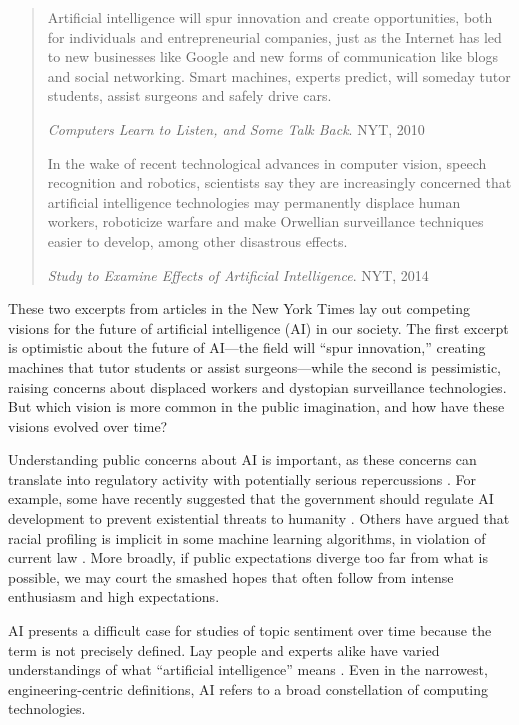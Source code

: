 \documentclass[letterpaper]{article}
\begin{document}
\begin{quote}
\footnotesize
Artificial intelligence will spur innovation and create opportunities, both for individuals and entrepreneurial companies, just as the Internet has led to new businesses like Google and new forms of communication like blogs and social networking. Smart machines, experts predict, will someday  tutor students, assist surgeons and safely drive cars.

\textit{Computers Learn to Listen, and Some Talk Back}. NYT, 2010

In the wake of recent technological advances in computer vision, speech recognition and robotics, scientists say they are increasingly concerned that artificial intelligence technologies may permanently displace human workers, roboticize warfare and make Orwellian surveillance techniques easier to develop, among other disastrous effects.

\textit{Study to Examine Effects of Artificial Intelligence}. NYT, 2014

\normalsize
\end{quote}

These two excerpts from articles in the New York Times lay out competing visions for the future of artificial intelligence (AI) in our society. The first excerpt is optimistic about the future of AI---the field will ``spur innovation,'' creating machines that tutor students or assist surgeons---while the second is pessimistic, raising concerns about displaced workers and dystopian surveillance technologies. But which vision is more common in the public imagination, and how have these visions evolved over time?

Understanding public concerns about AI is important, as these concerns can translate into regulatory activity with potentially serious repercussions \cite{ai100}. For example, some have recently suggested that the government should regulate AI development to prevent existential threats to humanity \cite{elon-regulatory}. Others have argued that racial profiling is implicit in some machine learning algorithms, in violation of current law \cite{machine-bias}. More broadly, if public expectations diverge too far from what is possible, we may court the smashed hopes that often follow from intense enthusiasm and high expectations.

AI presents a difficult case for studies of topic sentiment over time because the term is not precisely defined. Lay people and experts alike have varied understandings of what ``artificial intelligence'' means \cite{ai100}.  Even in the narrowest, engineering-centric definitions, AI refers to a broad constellation of computing technologies.
\end{document}

